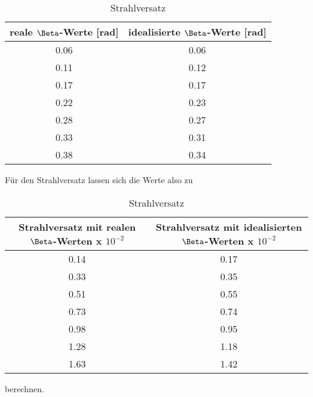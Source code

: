   \begin{table}[H]
    \centering
    \caption{Strahlversatz}
    \begin{tabular}{c c }
      \toprule
      reale $\Beta$-Werte [rad] &  idealisierte $\Beta$-Werte [rad]\\
      \midrule
        0.06 & 0.06 \\
        0.11 & 0.12 \\
        0.17 & 0.17 \\
        0.22 & 0.23 \\
        0.28 & 0.27 \\
        0.33 & 0.31 \\
        0.38 & 0.34 \\
      \bottomrule
    \end{tabular}
  \end{table}
  \noindent Für den Strahlversatz lassen sich die Werte also zu
  \begin{table}[H]
    \centering
    \caption{Strahlversatz}
    \begin{tabular}{c c }
      \toprule
      Strahlversatz mit realen $\Beta$-Werten x $10^{-2}$ & Strahlversatz mit idealisierten $\Beta$-Werten x $10^{-2}$\\
      \midrule
        0.14 & 0.17 \\
        0.33 & 0.35 \\
        0.51 & 0.55   \\
        0.73 & 0.74   \\
        0.98 & 0.95 \\
        1.28 & 1.18   \\
        1.63 & 1.42 \\
      \bottomrule
    \end{tabular}
  \end{table}
  berechnen.


